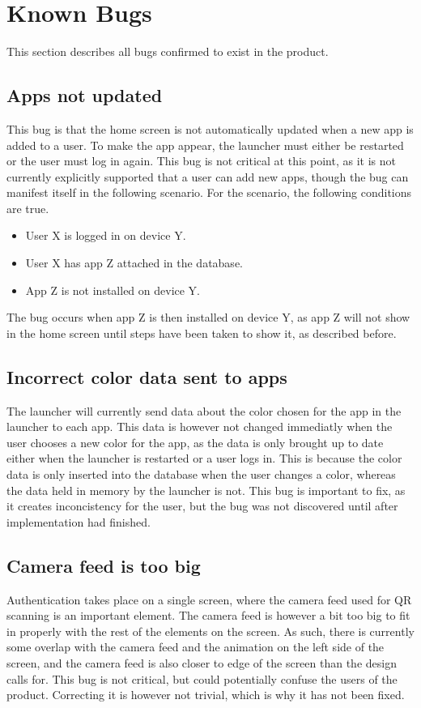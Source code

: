 \section{Known Bugs}
This section describes all bugs confirmed to exist in the product. 

\subsection{Apps not updated}
This bug is that the home screen is not automatically updated when a new app is added to a user. 
To make the app appear, the launcher must either be restarted or the user must log in again. 
This bug is not critical at this point, as it is not currently explicitly supported that a user can add new apps, though the bug can manifest itself in the following scenario.\newline
For the scenario, the following conditions are true.

\begin{itemize}
	\item User X is logged in on device Y.
	\item User X has app Z attached in the database. 
	\item App Z is not installed on device Y.
\end{itemize}

The bug occurs when app Z is then installed on device Y, as app Z will not show in the home screen until steps have been taken to show it, as described before. 

\subsection{Incorrect color data sent to apps}
The launcher will currently send data about the color chosen for the app in the launcher to each app. 
This data is however not changed immediatly when the user chooses a new color for the app, as the data is only brought up to date either when the launcher is restarted or a user logs in. 
This is because the color data is only inserted into the database when the user changes a color, whereas the data held in memory by the launcher is not. 
This bug is important to fix, as it creates inconcistency for the user, but the bug was not discovered until after implementation had finished. 

\subsection{Camera feed is too big}
Authentication takes place on a single screen, where the camera feed used for QR scanning is an important element. 
The camera feed is however a bit too big to fit in properly with the rest of the elements on the screen. 
As such, there is currently some overlap with the camera feed and the animation on the left side of the screen, and the camera feed is also closer to edge of the screen than the design calls for. \newline
This bug is not critical, but could potentially confuse the users of the product. 
Correcting it is however not trivial, which is why it has not been fixed. 